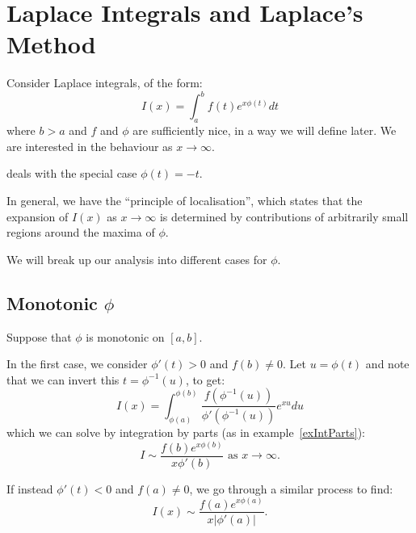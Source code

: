\documentclass[../Main.tex]{subfiles}
\begin{document}
\section{Laplace Integrals and Laplace's Method}
Consider Laplace integrals, of the form:
\begin{equation*}
    I(x) = \int_{a}^{b} f(t)e^{x\phi(t)} dt 
\end{equation*}
where $b > a$ and $f$ and $\phi$ are sufficiently nice, in a way we will define later. We are interested in the behaviour as $x \to \infty$.

\begin{remarks}
    \item {} deals with the special case $\phi(t) = -t$.
    \item In general, we have the ``principle of localisation'', which states that the expansion of $I(x)$ as $x \to \infty$ is determined by contributions of arbitrarily small regions around the maxima of $\phi$.
\end{remarks}
We will break up our analysis into different cases for $\phi$.
\subsection{Monotonic \texorpdfstring{$\phi$}{phi}}
Suppose that $\phi$ is monotonic on $[a, b]$.

In the first case, we consider $\phi'(t) > 0$ and $f(b) \neq 0$.
Let $u = \phi(t)$ and note that we can invert this $t = \phi^{-1}(u)$, to get:
\begin{equation*}
    I(x) = \int_{\phi(a)}^{\phi(b)} \frac{f(\phi^{-1}(u))}{\phi'(\phi^{-1}(u))} e^{xu} du 
\end{equation*}
which we can solve by integration by parts (as in example~\ref{exIntParts}):
\begin{equation*}
    I \sim \frac{f(b)e^{x\phi(b)}}{x\phi'(b)} \text{ as } x\to\infty.
\end{equation*}

If instead $\phi'(t) < 0$ and $f(a) \neq 0$, we go through a similar process to find:
\begin{equation*}
    I(x) \sim \frac{f(a) e^{x\phi(a)}}{x|\phi'(a)|}.
\end{equation*}
\end{document}
